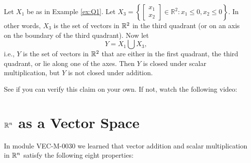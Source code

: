 \documentclass{ximera}
\begin{document}
\begin{example}
\begin{explanation}
\begin{center}
\quad
{}
\end{center}
\end{explanation}
\end{example}

\begin{example} \label{ex:Q1-3}
Let $X_1$ be as in Example \ref{ex:Q1}.  Let $X_3=\left\{\begin{bmatrix} x_1\\x_2\end{bmatrix} \in \mathbb{R}^2 : x_1 \le 0, x_2 \le 0 \right\}$.
In other words, $X_3$ is the set of vectors in $\mathbb{R}^2$ in the third quadrant (or on an axis on the boundary of the third quadrant).  Now let 
$$Y = X_1 \bigcup X_3,$$ 
i.e., $Y$ is the set of vectors in $\mathbb{R}^2$ that are either in the first quadrant, the third quadrant, or lie along one of the axes.  Then $Y$ is closed under scalar multiplication, but $Y$ is not closed under addition.
\begin{explanation} See if you can verify this claim on your own.  If not, watch the following video:

\end{explanation}

\end{example}


 
\section*{$\mathbb{R}^n$ as a Vector Space}

In module VEC-M-0030 we learned that vector addition and scalar multiplication in $\mathbb{R}^n$ satisfy the following eight properties:
\end{document}

